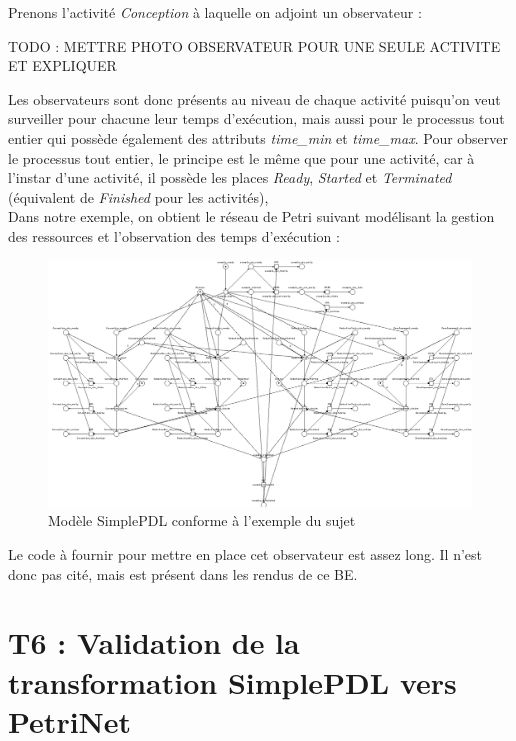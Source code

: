 \documentclass{report}
\begin{document}
Prenons l'activité \textit{Conception} à laquelle on adjoint un observateur :

TODO : METTRE PHOTO OBSERVATEUR POUR UNE SEULE ACTIVITE ET EXPLIQUER

Les observateurs sont donc présents au niveau de chaque activité puisqu'on veut surveiller pour chacune leur temps d'exécution, mais aussi pour le processus tout entier qui possède également des attributs \textit{time\_min} et \textit{time\_max}. Pour observer le processus tout entier, le principe est le même que pour une activité, car à l'instar d'une activité, il possède les places \textit{Ready}, \textit{Started} et \textit{Terminated} (équivalent de \textit{Finished} pour les activités), \\

Dans notre exemple, on obtient le réseau de Petri suivant modélisant la gestion des ressources et l'observation des temps d'exécution :

\begin{figure}[!h] 
\begin{center}
\includegraphics[width=18cm]{Capture-17.png}
\caption{Modèle SimplePDL conforme à l'exemple du sujet} 
\label{img1} 
\end{center}
\end{figure} 

Le code à fournir pour mettre en place cet observateur est assez long. Il n'est donc pas cité, mais est présent dans les rendus de ce BE.

\newpage

\section{T6 : Validation de la transformation SimplePDL vers PetriNet}
\end{document}
